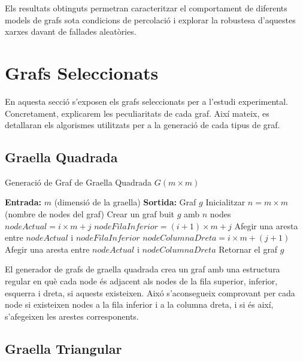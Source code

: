 \documentclass[a4paper]{article}
\begin{document}
	Els resultats obtinguts permetran caracteritzar el comportament de diferents models de grafs sota condicions de percolació i explorar la robustesa d'aquestes xarxes davant de fallades aleatòries.
	
	
	\newpage
	\section{Grafs Seleccionats}

	En aquesta secció s'exposen els grafs seleccionats per a l'estudi experimental. Concretament, explicarem les peculiaritats de cada graf. Així mateix, es detallaran els algorismes utilitzats per a la generació de cada tipus de graf. 

	\subsection{Graella Quadrada}
	\begin{algorithm} [H]
		\caption{Generació de Graf de Graella Quadrada $G(m \times m)$}
		\begin{algorithmic} [1]
			\Statex \textbf{Entrada:} $m$ (dimensió de la graella)
			\Statex \textbf{Sortida:} Graf $g$ 
			\Statex \vspace{-0.25em}
			\State Inicialitzar $n = m \times m$ (nombre de nodes del graf)
			\State Crear un graf buit $g$ amb $n$ nodes
					\State $nodeActual = i \times m + j$
						\State $nodeFilaInferior = (i + 1) \times m + j$
						\State Afegir una aresta entre $nodeActual$ i $nodeFilaInferior$
					\EndIf
						\State $nodeColumnaDreta = i \times m + (j + 1)$
						\State Afegir una aresta entre $nodeActual$ i $nodeColumnaDreta$
					\EndIf
				\EndFor
			\EndFor
			\State Retornar el graf $g$
		\end{algorithmic}
	\end{algorithm}

	El generador de grafs de graella quadrada crea un graf amb una estructura regular en què cada node és adjacent als nodes de la fila superior, inferior, esquerra i dreta, si aquests existeixen. Aixó s'aconsegueix comprovant per cada node si existeixen nodes a la fila inferior i a la columna dreta, i si és així, s'afegeixen les arestes corresponents. \\

	\subsection{Graella Triangular}
\end{document}
